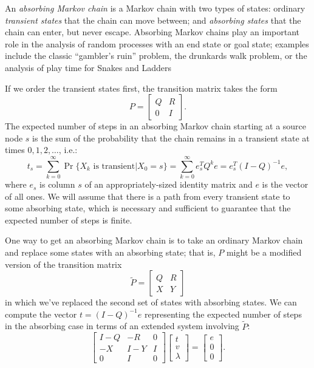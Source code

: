 \documentclass[12pt, leqno]{article}
\begin{document}
An {\em absorbing Markov chain} is a Markov chain with two types of
states: ordinary {\em transient states} that the chain can move
between; and {\em absorbing states} that the chain can enter, but
never escape.  Absorbing Markov chains play an important role in the
analysis of random processes with an end state or goal state; examples
include the classic ``gambler's ruin'' problem, the drunkards walk
problem, or the analysis of play time for Snakes and Ladders

If we order the transient states first, the transition
matrix takes the form
\[
  P = \begin{bmatrix} Q & R \\ 0 & I \end{bmatrix}.
\]
The expected number of steps in an absorbing Markov
chain starting at a source node $s$ is the sum of the probability that
the chain remains in a transient state at times $0, 1, 2, \ldots$,
i.e.:
\[
t_s
= \sum_{k=0}^\infty \operatorname{Pr}\{X_k \mbox{ is transient} | X_0 =s\}
= \sum_{k=0}^\infty e_s^T Q^k e = e_s^T (I-Q)^{-1} e,
\]
where $e_s$ is column $s$ of an appropriately-sized identity matrix
and $e$ is the vector of all ones.
We will assume that there is a path from every transient state to some
absorbing state, which is necessary and sufficient to guarantee that
the expected number of steps is finite.

One way to get an absorbing Markov chain is to take an ordinary
Markov chain and replace some states with an absorbing state; that is,
$P$ might be a modified version of the transition matrix
\[
  \tilde{P} = \begin{bmatrix} Q & R \\ X & Y \end{bmatrix}
\]
in which we've replaced the second set of states with absorbing states.
We can compute the vector $t = (I-Q)^{-1} e$ representing
the expected number of steps in the absorbing case
in terms of an extended system involving $\tilde{P}$:
\begin{equation} \label{eq:ext-system}
\begin{bmatrix}
  I-Q & -R & 0 \\
  -X & I-Y & I \\
  0 & I & 0
\end{bmatrix}
\begin{bmatrix}
  t \\ v \\ \lambda
\end{bmatrix} =
\begin{bmatrix}
  e \\ 0 \\ 0
\end{bmatrix}.
\end{equation}
\end{document}
